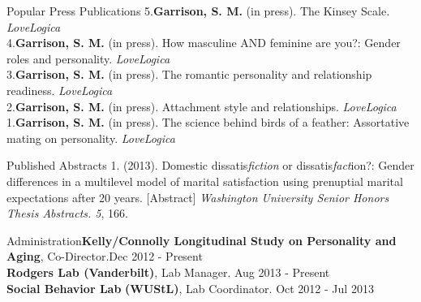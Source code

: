 \documentclass {resume}
\begin{document}
\pagestyle{myheadings}
\begin{samepage}\begin{rSection}{\textrm{Popular Press Publications}}
5.\hspace* {2.5 mm}\textbf{Garrison, S. M.} (in press). The Kinsey Scale. \textit{LoveLogica}\smallskip\\
4.\hspace* {2.5 mm}\textbf{Garrison, S. M.} (in press). How masculine AND feminine are you?: Gender roles and personality. \textit{LoveLogica}\smallskip\\
3.\hspace* {2.5 mm}\textbf{Garrison, S. M.} (in press). %
The romantic personality and relationship readiness. \textit{LoveLogica}\smallskip\\
2.\hspace* {2.5 mm}\textbf{Garrison, S. M.} (in press). Attachment style and relationships. \textit{LoveLogica}\smallskip\\
1.\hspace* {2.5 mm}\textbf{Garrison, S. M.} (in press). The science behind birds of a feather: Assortative mating on personality. \textit{LoveLogica}
\end{rSection}\end{samepage}
\begin{samepage}\begin{rSection}{\textrm{Published Abstracts}}
1.\hspace* {2.5 mm}{\bf Garrison, S. M.} (2013). Domestic dissatis{\em fiction} or dissatis{\em fact}ion?: Gender differences in a multilevel model \hspace* {6 mm}of marital satisfaction using prenuptial marital expectations after 20 years. [Abstract] {\em Washington University \hspace* {6 mm}Senior Honors Thesis Abstracts. 5}, 166.\end{rSection}\end{samepage}
\begin{rSection}{\textrm{Administration}}\textbf{Kelly/Connolly Longitudinal Study on Personality and Aging}, Co-Director.\hfill Dec 2012 - Present\smallskip\\
\textbf{Rodgers Lab (Vanderbilt)}, Lab Manager. \hfill Aug 2013 - Present\smallskip\\
\textbf{Social Behavior Lab} \textbf{(WUStL)}, Lab Coordinator. \hfill Oct 2012 - Jul 2013
\end{rSection}
\end{document}
